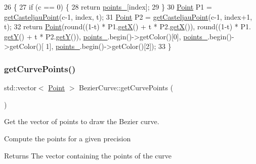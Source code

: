 \begin{DoxyCode}
26                                                                \{
27     \textcolor{keywordflow}{if} (c == 0) \{
28         \textcolor{keywordflow}{return} \mbox{\hyperlink{class_bezier_curve_a73c8f89d9002be75295e6a0546547189}{points\_}}[index];
29     \}
30     \mbox{\hyperlink{class_point}{Point}} P1 = \mbox{\hyperlink{class_bezier_curve_a7e0c40cb373da6aa1aa1acd5fce9d503}{getCasteljauPoint}}(c-1, index, t);
31     \mbox{\hyperlink{class_point}{Point}} P2 = \mbox{\hyperlink{class_bezier_curve_a7e0c40cb373da6aa1aa1acd5fce9d503}{getCasteljauPoint}}(c-1, index+1, t);
32     \textcolor{keywordflow}{return} \mbox{\hyperlink{class_point}{Point}}(round((1-t) * P1.\mbox{\hyperlink{class_point_ac9d5859db121c7d1b89ca89266dca0a3}{getX}}() + t * P2.\mbox{\hyperlink{class_point_ac9d5859db121c7d1b89ca89266dca0a3}{getX}}()), round((1-t) * P1.
      \mbox{\hyperlink{class_point_a86d10ff46e08462c45b15a8c7ef62d61}{getY}}() + t * P2.\mbox{\hyperlink{class_point_a86d10ff46e08462c45b15a8c7ef62d61}{getY}}()), \mbox{\hyperlink{class_bezier_curve_a73c8f89d9002be75295e6a0546547189}{points\_}}.begin()->getColor()[0], \mbox{\hyperlink{class_bezier_curve_a73c8f89d9002be75295e6a0546547189}{points\_}}.begin()->getColor()[
      1], \mbox{\hyperlink{class_bezier_curve_a73c8f89d9002be75295e6a0546547189}{points\_}}.begin()->getColor()[2]);
33 \}
\end{DoxyCode}
\mbox{\label{class_bezier_curve_a2b4482d322a84df3fa22f4e491cb2bc3}} 
\subsubsection{\texorpdfstring{get\+Curve\+Points()}{getCurvePoints()}}
{\footnotesize\ttfamily std\+::vector$<$ \mbox{\hyperlink{class_point}{Point}} $>$ Bezier\+Curve\+::get\+Curve\+Points (\begin{DoxyParamCaption}{ }\end{DoxyParamCaption})}



Get the vector of points to draw the Bezier curve. 

Compute the points for a given precision \begin{DoxyReturn}{Returns}
The vector containing the points of the curve 
\end{DoxyReturn}

